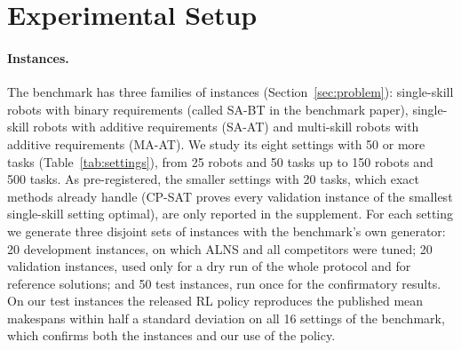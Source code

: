 \section{Experimental Setup}
\label{sec:setup}



\paragraph{Instances.} The benchmark has three families of instances (Section~\ref{sec:problem}): single-skill robots
with binary requirements (called SA-BT in the benchmark paper), single-skill robots with additive requirements (SA-AT)
and multi-skill robots with additive requirements (MA-AT). We study its eight settings with 50 or more tasks
(Table~\ref{tab:settings}), from 25 robots and 50 tasks up to 150 robots and 500 tasks. As pre-registered, the smaller
settings with 20 tasks, which exact methods already handle (CP-SAT proves every validation instance of the smallest
single-skill setting optimal), are only reported in the supplement. For each setting we generate three disjoint sets
of instances with the benchmark's own generator: 20 development instances, on which ALNS and all competitors were
tuned; 20 validation instances, used only for a dry run of the whole protocol and for reference solutions; and 50 test
instances, run once for the confirmatory results. On our test instances the released RL policy reproduces the
published mean makespans within half a standard deviation on all 16 settings of the benchmark, which confirms both the
instances and our use of the policy.

